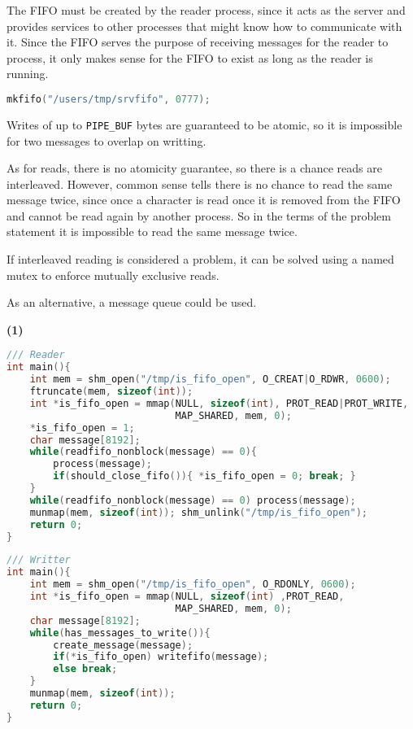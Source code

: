 \documentclass{sope}
\begin{document}
{


The FIFO must be created by the reader process, since it acts as the server and provides services to other processes that might know how to communicate with it. Since the FIFO serves the purpose of receiving messages for the reader to process, it only makes sense for the FIFO to exist as long as the reader is running.

\begin{lstlisting}[language=C]
mkfifo("/users/tmp/srvfifo", 0777);
\end{lstlisting}

Writes of up to \texttt{PIPE\_BUF} bytes are guaranteed to be atomic, so it is impossible for two messages to overlap on writting.\par
As for reads, there is no atomicity guarantee, so there is a chance reads are interleaved. However, common sense tells there is no chance to read the same message twice, since once a character is read once it is removed from the FIFO and cannot be read again by another process. So in the terms of the problem statement it is impossible to read the same message twice.\par
If interleaved reading is considered a problem, it can be solved using a named mutex to enforce mutually exclusive reads.\par
As an alternative, a message queue could be used.

\textbf{(1)}
\begin{lstlisting}[language=C]
/// Reader
int main(){
    int mem = shm_open("/tmp/is_fifo_open", O_CREAT|O_RDWR, 0600);
    ftruncate(mem, sizeof(int));
    int *is_fifo_open = mmap(NULL, sizeof(int), PROT_READ|PROT_WRITE,
                             MAP_SHARED, mem, 0);
    *is_fifo_open = 1;
    char message[8192];
    while(readfifo_nonblock(message) == 0){
        process(message);
        if(should_close_fifo()){ *is_fifo_open = 0; break; }
    }
    while(readfifo_nonblock(message) == 0) process(message);
    munmap(mem, sizeof(int)); shm_unlink("/tmp/is_fifo_open");
    return 0;
}
\end{lstlisting}
\begin{lstlisting}[language=C]
/// Writter
int main(){
    int mem = shm_open("/tmp/is_fifo_open", O_RDONLY, 0600);
    int *is_fifo_open = mmap(NULL, sizeof(int) ,PROT_READ,
                             MAP_SHARED, mem, 0);
    char message[8192];
    while(has_messages_to_write()){
        create_message(message);
        if(*is_fifo_open) writefifo(message);
        else break;
    }
    munmap(mem, sizeof(int));
    return 0;
}
\end{lstlisting}

}
\end{document}
